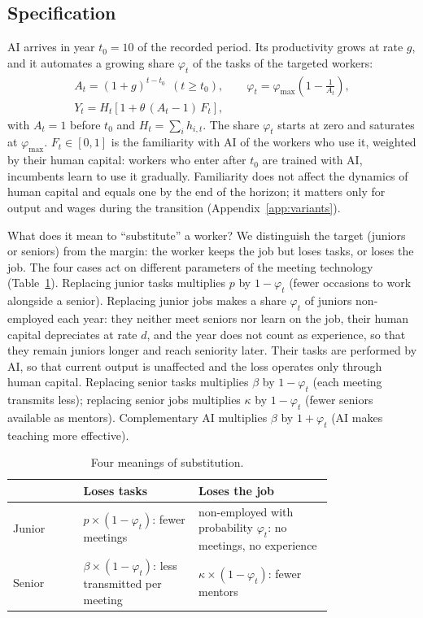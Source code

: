 \documentclass[preprint,12pt,authoryear]{elsarticle}
\begin{document}
\subsection{Specification}

AI arrives in year $t_0=10$ of the recorded period. Its productivity grows at rate $g$, and it automates a growing share $\varphi_t$ of the tasks of the targeted workers:
\begin{gather}
A_t = (1+g)^{t-t_0}\ \ (t\ge t_0), \qquad \varphi_t = \varphi_{\max}\left(1-\frac{1}{A_t}\right), \label{eq:ai}\\
Y_t = H_t\left[1+\theta\,(A_t-1)\,F_t\right], \label{eq:aiY}
\end{gather}
with $A_t=1$ before $t_0$ and $H_t=\sum_i h_{i,t}$. The share $\varphi_t$ starts at zero and saturates at $\varphi_{\max}$. $F_t\in[0,1]$ is the familiarity with AI of the workers who use it, weighted by their human capital: workers who enter after $t_0$ are trained with AI, incumbents learn to use it gradually. Familiarity does not affect the dynamics of human capital and equals one by the end of the horizon; it matters only for output and wages during the transition (Appendix~\ref{app:variants}).

What does it mean to ``substitute'' a worker? We distinguish the target (juniors or seniors) from the margin: the worker keeps the job but loses tasks, or loses the job. The four cases act on different parameters of the meeting technology (Table~\ref{tab:margins}). Replacing junior tasks multiplies $p$ by $1-\varphi_t$ (fewer occasions to work alongside a senior). Replacing junior jobs makes a share $\varphi_t$ of juniors non-employed each year: they neither meet seniors nor learn on the job, their human capital depreciates at rate $d$, and the year does not count as experience, so that they remain juniors longer and reach seniority later. Their tasks are performed by AI, so that current output is unaffected and the loss operates only through human capital. Replacing senior tasks multiplies $\beta$ by $1-\varphi_t$ (each meeting transmits less); replacing senior jobs multiplies $\kappa$ by $1-\varphi_t$ (fewer seniors available as mentors). Complementary AI multiplies $\beta$ by $1+\varphi_t$ (AI makes teaching more effective).

\begin{table}[t]\centering\small
\caption{Four meanings of substitution.}\label{tab:margins}
\begin{tabular}{@{}lp{0.36\linewidth}p{0.42\linewidth}@{}}
\toprule
 & Loses tasks & Loses the job \\
\midrule
Junior & $p\times(1-\varphi_t)$: fewer meetings & non-employed with probability $\varphi_t$: no meetings, no experience \\
Senior & $\beta\times(1-\varphi_t)$: less transmitted per meeting & $\kappa\times(1-\varphi_t)$: fewer mentors \\
\bottomrule
\end{tabular}
\end{table}
\end{document}
